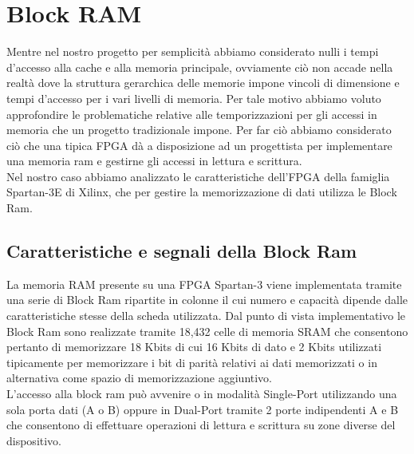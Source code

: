 \clearpage{\pagestyle{empty}\cleardoublepage}
\chapter{Block RAM}


Mentre nel nostro progetto per semplicit\`a  abbiamo considerato nulli i tempi d'accesso alla cache e alla memoria principale, ovviamente ci\`o non accade nella realt\`a dove la struttura gerarchica delle memorie impone vincoli di dimensione e tempi d'accesso per i vari livelli di memoria. Per tale motivo abbiamo voluto approfondire le problematiche relative alle temporizzazioni per gli accessi in memoria che un progetto tradizionale impone. Per far ci\`o abbiamo considerato ci\`o che una tipica FPGA d\`a a disposizione ad un progettista per implementare una memoria ram e gestirne gli accessi in lettura e scrittura.
\\
Nel nostro caso abbiamo analizzato le caratteristiche dell'FPGA della famiglia Spartan-3E di Xilinx, che per gestire la memorizzazione di dati utilizza le Block Ram.

\section{Caratteristiche e segnali della Block Ram}

La memoria RAM presente su una FPGA Spartan-3 viene implementata tramite una serie di Block Ram ripartite in colonne il cui numero e capacit\`a dipende dalle caratteristiche stesse della scheda utilizzata. Dal punto di vista implementativo le Block Ram sono realizzate tramite 18,432 celle di memoria SRAM che consentono pertanto di memorizzare 18 Kbits di cui 16 Kbits di dato e 2 Kbits utilizzati tipicamente per memorizzare i bit di parit\`a relativi ai dati memorizzati o in alternativa come spazio di memorizzazione aggiuntivo.\\
L'accesso alla block ram pu\`o avvenire o in modalit\`a Single-Port utilizzando una sola porta dati (A o B) oppure in Dual-Port  tramite 2 porte indipendenti A e B che consentono di effettuare operazioni di lettura e scrittura su zone diverse del dispositivo.

